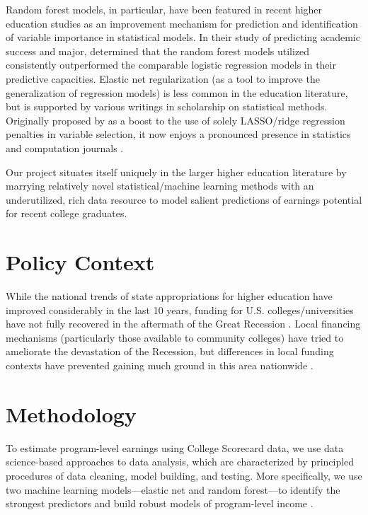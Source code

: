 \documentclass[a4paper, 12pt]{article}
\begin{document}
Random forest models, in particular, have been featured in recent higher education studies as an improvement mechanism for prediction and identification of variable importance in statistical models. In their study of predicting academic success and major, \textcite{beaulacrosenthal_2019} determined that the random forest models utilized consistently outperformed the comparable logistic regression models in their predictive capacities. Elastic net regularization (as a tool to improve the generalization of regression models) is less common in the education literature, but is supported by various writings in scholarship on statistical methods. Originally proposed by \textcite{zouhastie_2005} as a boost to the use of solely LASSO/ridge regression penalties in variable selection, it now enjoys a pronounced presence in statistics and computation journals \parencite{zouzhang_2009, lilin_2010}.

Our project situates itself uniquely in the larger higher education literature by marrying relatively novel statistical/machine learning methods with an underutilized, rich data resource to model salient predictions of earnings potential for recent college graduates.

\section*{Policy Context}

While the national trends of state appropriations for higher education have improved considerably in the last 10 years, funding for U.S. colleges/universities have not fully recovered in the aftermath of the Great Recession \parencite{shef_2021}. Local financing mechanisms (particularly those available to community colleges) have tried to ameliorate the devastation of the Recession, but differences in local funding contexts have prevented gaining much ground in this area nationwide \parencite{dowdgrant_2006}.

\section*{Methodology}

To estimate program-level earnings using College Scorecard data, we use data science-based approaches to data analysis, which are characterized by principled procedures of data cleaning, model building, and testing. More specifically, we use two machine learning models---elastic net and random forest---to identify the strongest predictors and build robust models of program-level income \parencite{Hastie_etal_2016, Kuhn_Silge_2022}.
\end{document}
